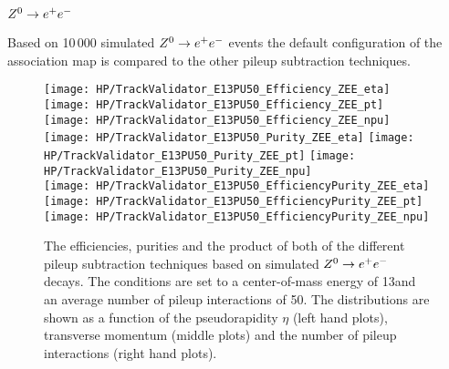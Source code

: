 \subsubsection{$\Zz\rightarrow\EE$}

Based on 10\,000 simulated  $\Zz\rightarrow\EE$ events the default configuration of the association map is compared to the other pileup subtraction techniques.

\begin{figure}[!h]
  \centering
  \texttt{[image: HP/TrackValidator\_E13PU50\_Efficiency\_ZEE\_eta]}
  \texttt{[image: HP/TrackValidator\_E13PU50\_Efficiency\_ZEE\_pt]}
  \texttt{[image: HP/TrackValidator\_E13PU50\_Efficiency\_ZEE\_npu]}
   \\
  \texttt{[image: HP/TrackValidator\_E13PU50\_Purity\_ZEE\_eta]}
  \texttt{[image: HP/TrackValidator\_E13PU50\_Purity\_ZEE\_pt]}
  \texttt{[image: HP/TrackValidator\_E13PU50\_Purity\_ZEE\_npu]}
   \\
  \texttt{[image: HP/TrackValidator\_E13PU50\_EfficiencyPurity\_ZEE\_eta]}
  \texttt{[image: HP/TrackValidator\_E13PU50\_EfficiencyPurity\_ZEE\_pt]}
  \texttt{[image: HP/TrackValidator\_E13PU50\_EfficiencyPurity\_ZEE\_npu]}
  \caption[Efficiencies, purities and their product of the different pileup subtraction techniques based $\Zz\rightarrow\EE$ decays with 13\TeV and $\left<PU\right>=50$]{The efficiencies, purities and the product of both of the different pileup subtraction techniques based on simulated $\Zz\rightarrow\EE$ decays. The conditions are set to a center-of-mass energy of 13\TeV and an average number of pileup interactions of 50. The distributions are shown as a function of the pseudorapidity $\eta$ (left hand plots), transverse momentum (middle plots) and the number of pileup interactions (right hand plots).}
\end{figure}
\clearpage

